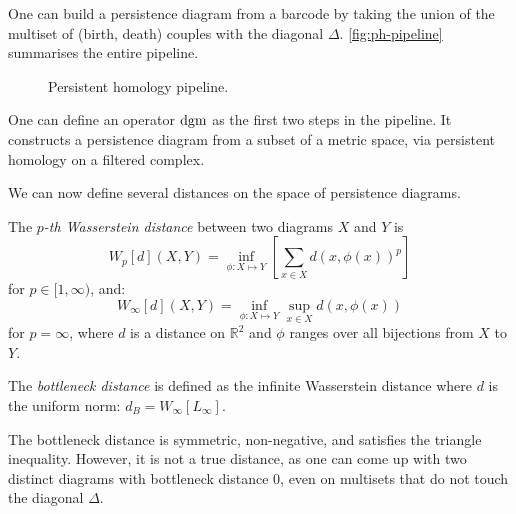 \documentclass[a4paper,11pt,openany,extrafontsizes]{memoir}
\begin{document}
One can build a persistence diagram from a barcode by taking the union
of the multiset of (birth, death) couples with the diagonal
$\Delta$. \autoref{fig:ph-pipeline} summarises the entire pipeline.

\begin{figure}[ht]
  \centering

  \caption{Persistent homology pipeline.}%
  \label{fig:ph-pipeline}
\end{figure}

One can define an operator $\operatorname{dgm}$ as the first two steps in the
pipeline. It constructs a persistence diagram from a subset of a
metric space, via persistent homology on a filtered complex.

We can now define several distances on the space of persistence
diagrams.

\begin{defn}\label{defn:wasserstein-dist}
  The \emph{$p$-th Wasserstein distance} between two diagrams $X$ and
  $Y$ is
  \[ W_p[d](X, Y) = \inf_{\phi:X\mapsto Y} \left[\sum_{x\in X} {d\left(x, \phi(x)\right)}^p\right] \]
  for $p\in [1,\infty)$, and:
  \[ W_\infty[d](X, Y) = \inf_{\phi:X\mapsto Y} \sup_{x\in X} d\left(x,
      \phi(x)\right) \] for $p = \infty$, where $d$ is a distance on
  $\mathbb{R}^2$ and $\phi$ ranges over all bijections from $X$ to
  $Y$.
\end{defn}

\begin{defn}\label{defn:bottleneck}
  The \emph{bottleneck distance} is defined as the infinite
  Wasserstein distance where $d$ is the uniform norm:
  $d_B = W_\infty[L_\infty]$.
\end{defn}

The bottleneck distance is symmetric, non-negative, and satisfies the
triangle inequality. However, it is not a true distance, as one can
come up with two distinct diagrams with bottleneck distance 0, even
on multisets that do not touch the diagonal $\Delta$.
\end{document}
